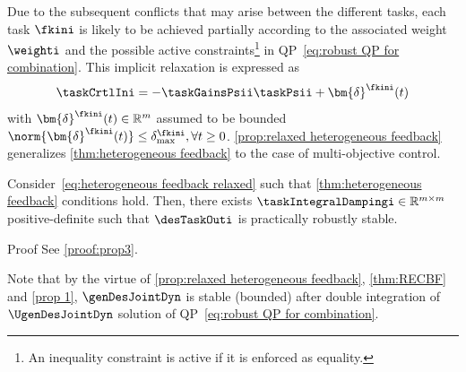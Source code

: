 Due to the subsequent conflicts that may arise between the different tasks, each task $\fkini$ is likely to be achieved partially according to the associated weight $\weighti$ and the possible active constraints\footnote{An inequality constraint is active if it is enforced as equality.} in QP~\eqref{eq:robust QP for combination}. This implicit relaxation is expressed as %
\begin{equation}\label{eq:heterogeneous feedback relaxed}
	\taskCrtlIni = -\taskGainsPsii\taskPsii+ \bm{\delta}^{\fkini}(t)
\end{equation} 
with $\bm{\delta}^{\fkini}(t)\in\mathbb{R}^{m}$ assumed to be bounded $\norm{\bm{\delta}^{\fkini}(t)}\leq\delta^{\fkini}_{\max}, \forall t \geq0$. 
\cref{prop:relaxed heterogeneous feedback} generalizes \cref{thm:heterogeneous feedback} to  the case of multi-objective control.%
\begin{proposition}\label{prop:relaxed heterogeneous feedback}
	Consider~\cref{eq:heterogeneous feedback relaxed}  such that \cref{thm:heterogeneous feedback} conditions hold. Then, there exists $\taskIntegralDampingi\in\mathbb{R}^{m\times m}$ positive-definite such that $\desTaskOuti$ is practically robustly stable. %
\end{proposition}
\begin{custumProof}{Proof}
	See \cref{proof:prop3}.
\end{custumProof}
Note that by the virtue of \cref{prop:relaxed heterogeneous feedback}, \cref{thm:RECBF} and \cref{prop 1}, $\genDesJointDyn$ is stable (bounded) after double integration of $\UgenDesJointDyn$ solution of QP~\eqref{eq:robust QP for combination}.

